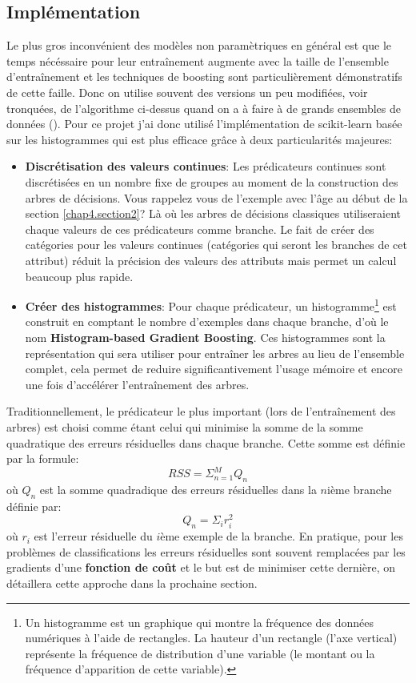 \subsection{Implémentation}
\label{chap4.sec4.sub2}
Le plus gros inconvénient des modèles non paramètriques en général est que le temps nécéssaire pour leur entraînement augmente avec la taille de l'ensemble d'entraînement et les techniques de boosting sont particulièrement démonstratifs de cette faille. Donc on utilise souvent des versions un peu modifiées, voir tronquées, de l'algorithme ci-dessus quand on a à faire à de grands ensembles de données (\cite{odegua2020predicting}). Pour ce projet j'ai donc utilisé l'implémentation de scikit-learn basée sur les histogrammes qui est plus efficace grâce à deux particularités majeures:

\begin{itemize}
    \item \textbf{Discrétisation des valeurs continues}: Les prédicateurs continues sont discrétisées en un nombre fixe de groupes au moment de la construction des arbres de décisions. Vous rappelez vous de l'exemple avec l'âge au début de la section \ref{chap4.section2}? Là où les arbres de décisions classiques utiliseraient chaque valeurs de ces prédicateurs comme branche. Le fait de créer des catégories pour les valeurs continues (catégories qui seront les branches de cet attribut) réduit la précision des valeurs des attributs mais permet un calcul beaucoup plus rapide.
    \item \textbf{Créer des histogrammes}: Pour chaque prédicateur, un histogramme\footnote{Un histogramme est un graphique qui montre la fréquence des données numériques à l'aide de rectangles. La hauteur d'un rectangle (l'axe vertical) représente la fréquence de distribution d'une variable (le montant ou la fréquence d'apparition de cette variable).} est construit en comptant le nombre d'exemples dans chaque branche, d'où le nom \textbf{Histogram-based Gradient Boosting}. Ces histogrammes sont la représentation qui sera utiliser pour entraîner les arbres au lieu de l'ensemble complet, cela permet de reduire significantivement l'usage mémoire et encore une fois d'accélérer l'entraînement des arbres. 
\end{itemize}

Traditionnellement, le prédicateur le plus important (lors de l'entraînement des arbres) est choisi comme étant celui qui minimise la somme de la somme quadratique des erreurs résiduelles dans chaque branche. Cette somme est définie par la formule: \[RSS = \Sigma_{n=1}^M Q_n\] où \(Q_n\) est la somme quadradique des erreurs résiduelles dans la \(n\)ième branche définie par: \[Q_n = \Sigma_i r_i^2\] où \(r_i\) est l'erreur résiduelle du \(i\)ème exemple de la branche. En pratique, pour les problèmes de classifications les erreurs résiduelles sont souvent remplacées par les gradients d'une \textbf{fonction de coût} et le but est de minimiser cette dernière, on détaillera cette approche dans la prochaine section.

